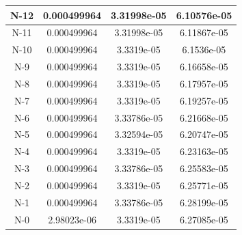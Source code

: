 \documentclass[10pt,a4paper,oneside,russian]{article}
\begin{document}
\begin{tabular}{|c|c|c|c|}
N-12&0.000499964&3.31998e-05&6.10576e-05\\ \hline
N-11&0.000499964&3.31998e-05&6.11867e-05\\ \hline
N-10&0.000499964&3.3319e-05&6.1536e-05\\ \hline
N-9&0.000499964&3.3319e-05&6.16658e-05\\ \hline
N-8&0.000499964&3.3319e-05&6.17957e-05\\ \hline
N-7&0.000499964&3.3319e-05&6.19257e-05\\ \hline
N-6&0.000499964&3.33786e-05&6.21668e-05\\ \hline
N-5&0.000499964&3.32594e-05&6.20747e-05\\ \hline
N-4&0.000499964&3.3319e-05&6.23163e-05\\ \hline
N-3&0.000499964&3.33786e-05&6.25583e-05\\ \hline
N-2&0.000499964&3.3319e-05&6.25771e-05\\ \hline
N-1&0.000499964&3.33786e-05&6.28199e-05\\ \hline
N-0&2.98023e-06&3.3319e-05&6.27085e-05\\ \hline
  \end{tabular}
\end{document}
